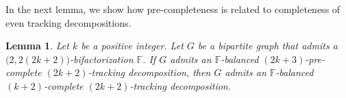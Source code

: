 \documentclass[12pt,reqno,a4paper]{amsart}
\newtheorem{lemma}[theorem]{Lemma}
\begin{document}


In the next lemma, we show how pre-completeness is related to completeness
of even tracking decompositions.  

\begin{lemma}\label{lemma:even-complete}
	Let \(k\) be a positive integer.
	Let \(G\) be a bipartite graph that admits a  
	\(\big(2,2(2k+2)\big)\)-bifactorization \(\mathbb{F}\).
	If \(G\) admits an \(\mathbb{F}\)-balanced \((2k+3)\)-pre-complete $(2k+2)$-tracking decomposition, 
	then \(G\) admits an \(\mathbb{F}\)-balanced \((k+2)\)-complete $(2k+2)$-tracking decomposition.
\end{lemma}
\end{document}
